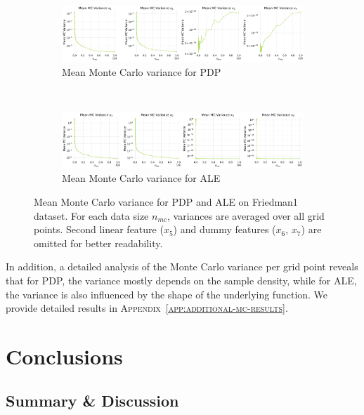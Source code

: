 \documentclass[runningheads]{llncs}
\begin{document}
\begin{figure}[h!]
    \centering
    \begin{subfigure}[b]{\textwidth}
        \centering
        \includegraphics[width=\textwidth]{img/mean_mc_variance_friedman1_pdp.png}
        \caption{Mean Monte Carlo variance for PDP}
        \label{fig:mc-variance-pdp}  %
    \end{subfigure}
    \\[10pt]
    \vfill
    \begin{subfigure}[b]{\textwidth}
        \centering
        \includegraphics[width=\textwidth]{img/mean_mc_variance_friedman1_ale.png}
        \caption{Mean Monte Carlo variance for ALE}
        \label{fig:mc-variance-ale}  %
    \end{subfigure}
    \caption{Mean Monte Carlo variance for PDP and ALE on Friedman1 dataset.
        For each data size $n_{mc}$, variances are averaged over all grid points.
        Second linear feature ($x_5$) and dummy features ($x_6$, $x_7$) are omitted for better readability.}
    \label{fig:mc-variance}  %
\end{figure}

In addition, a detailed analysis of the Monte Carlo variance per grid point
reveals that for PDP, the variance mostly depends on the sample density, while
for ALE, the variance is also influenced by the shape of the underlying
function. We provide detailed results in
\textsc{Appendix~\ref{app:additional-mc-results}}.

\clearpage
\section{Conclusions}\label{sec:conclusion}

\subsection{Summary \& Discussion}
\end{document}
